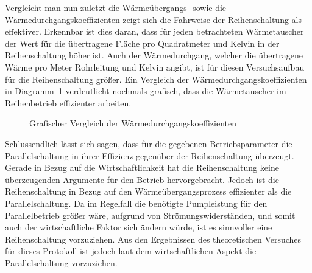 Vergleicht man nun zuletzt die Wärmeübergangs- sowie die Wärmedurchgangskoeffizienten zeigt sich die Fahrweise der Reihenschaltung als effektiver. Erkennbar ist dies daran, dass für jeden betrachteten Wärmetauscher der Wert für die übertragene Fläche pro Quadratmeter und Kelvin in der Reihenschaltung höher ist. Auch der Wärmedurchgang, welcher die übertragene Wärme pro Meter Rohrleitung und Kelvin angibt, ist für diesen Versuchsaufbau für die Reihenschaltung größer. Ein Vergleich der Wärmedurchgangskoeffizienten in \mbox{Diagramm \ref{dia:durchng}} verdeutlicht nochmals grafisch, dass die Wärmetauscher im Reihenbetrieb effizienter arbeiten.

\begin{figure}[h!]
	\begin{center}
		\caption{Grafischer Vergleich der Wärmedurchgangskoeffizienten}
		\label{dia:durchng}
	\end{center}
\end{figure}
\FloatBarrier
\newpage
Schlussendlich lässt sich sagen, dass für die gegebenen Betriebsparameter die Parallelschaltung in ihrer Effizienz gegenüber der Reihenschaltung überzeugt. Gerade in Bezug auf die Wirtschaftlichkeit hat die Reihenschaltung keine überzeugenden Argumente für den Betrieb hervorgebracht. Jedoch ist die Reihenschaltung in Bezug auf den Wärmeübergangsprozess effizienter als die Parallelschaltung. Da im Regelfall die benötigte Pumpleistung für den Parallelbetrieb größer wäre, aufgrund von Strömungswiderständen, und somit auch der wirtschaftliche Faktor sich ändern würde, ist es sinnvoller eine Reihenschaltung vorzuziehen. Aus den Ergebnissen des theoretischen Versuches für dieses Protokoll ist jedoch laut dem wirtschaftlichen Aspekt die Parallelschaltung vorzuziehen.
